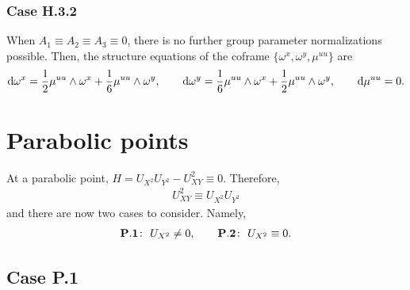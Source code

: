 \documentclass[10pt,a4paper]{amsart}
\numberwithin{equation}{section}
\begin{document}
\subsubsection{Case H.3.2}

When $A_1\equiv A_2 \equiv A_3 \equiv 0$, there is no further group parameter normalizations possible. Then, the structure equations of the coframe $\{\omega^x,\omega^y,\mu^{uu}\}$ are
%
\begin{gather}\label{eq:H.3.2 structure}
{\rm d}\omega^x = \frac{1}{2} \mu^{uu}\wedge \omega^x + \frac{1}{6} \mu^{uu}\wedge \omega^y,\qquad
%
{\rm d}\omega^y = \frac{1}{6} \mu^{uu}\wedge \omega^x + \frac{1}{2} \mu^{uu}\wedge \omega^y,\qquad {\rm d}\mu^{uu}=0.
\end{gather}

\section{Parabolic points}\label{sec: parabolic}

At a parabolic point, $H = U_{X^2}U_{Y^2} - U_{XY}^2 \equiv 0$. Therefore,
\begin{gather}\label{eq:H=0}
U_{XY}^2 \equiv U_{X^2}U_{Y^2}
\end{gather}
and there are now two cases to consider. Namely,
\begin{gather*}
{\bf P.1}\colon\ U_{X^2}\neq 0,\qquad
{\bf P.2}\colon\ U_{X^2}\equiv 0.
\end{gather*}

\subsection{Case P.1}
\end{document}
